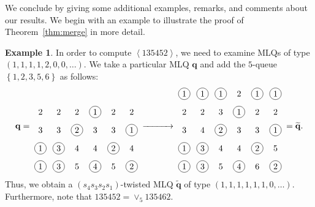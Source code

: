 \documentclass[reqno]{amsart}
\newcommand{\0}{\phantom{c}}
\newcommand{\swt}[1]{\left\langle #1 \right\rangle} %
\newcommand{\merge}[1]{\vee_{#1}} %
\newcommand{\qq}{\mathbf{q}}
\newcommand{\set}[1]{\left\{ #1 \right\}}
\theoremstyle{plain}
\theoremstyle{definition}
\newtheorem{example}[thm]{Example}
\numberwithin{equation}{section}
\begin{document}
We conclude by giving some additional examples, remarks, and comments about our results.
We begin with an example to illustrate the proof of Theorem~\ref{thm:merge} in more detail.

\begin{example}
In order to compute $\swt{135452}$, we need to examine MLQs of type $(1,1,1,1, 2, 0, 0, \ldots)$.
We take a particular MLQ $\qq$ and add the $5$-queue $\set{1,2,3,5,6}$ as follows:
\[
\qq = \;
\begin{tikzpicture}[baseline=66,scale=0.75,every node/.style={inner sep=2pt}]
\node at (0, 4){2};\node at (1, 4){2};\node at (2, 4){2};\node[circle, draw=black] at (3, 4){1};\node at (4, 4){2};\node at (5, 4){2};\node at (0, 3){3};\node at (1, 3){3};\node[circle, draw=black] at (2, 3){2};\node at (3, 3){3};\node at (4, 3){3};\node[circle, draw=black] at (5, 3){1};\node[circle, draw=black] at (0, 2){1};\node[circle, draw=black] at (1, 2){3};\node at (2, 2){4};\node at (3, 2){4};\node[circle, draw=black] at (4, 2){2};\node at (5, 2){4};\node[circle, draw=black] at (0, 1){1};\node[circle, draw=black] at (1, 1){3};\node at (2, 1){5};\node[circle, draw=black] at (3, 1){4};\node at (4, 1){5};\node[circle, draw=black] at (5, 1){2};
\end{tikzpicture}
\; \xrightarrow{\hspace{30pt}} \;
\begin{tikzpicture}[baseline=66,scale=0.75,every node/.style={inner sep=2pt}]
\node[circle, draw=black] at (0, 5){1};\node[circle, draw=black] at (1, 5){1};\node[circle, draw=black] at (2, 5){1};\node at (3, 5){2};\node[circle, draw=black] at (4, 5){1};\node[circle, draw=black] at (5, 5){1};\node at (0, 4){2};\node at (1, 4){2};\node at (2, 4){3};\node[circle, draw=black] at (3, 4){1};\node at (4, 4){2};\node at (5, 4){2};\node at (0, 3){3};\node at (1, 3){4};\node[circle, draw=black] at (2, 3){2};\node at (3, 3){3};\node at (4, 3){3};\node[circle, draw=black] at (5, 3){1};\node[circle, draw=black] at (0, 2){1};\node[circle, draw=black] at (1, 2){3};\node at (2, 2){4};\node at (3, 2){4};\node[circle, draw=black] at (4, 2){2};\node at (5, 2){5};\node[circle, draw=black] at (0, 1){1};\node[circle, draw=black] at (1, 1){3};\node at (2, 1){5};\node[circle, draw=black] at (3, 1){4};\node at (4, 1){6};\node[circle, draw=black] at (5, 1){2};
\end{tikzpicture}
\; = \widetilde{\qq}.
\]
Thus, we obtain a $(s_4 s_3 s_2 s_1)$-twisted MLQ $\widetilde{\qq}$ of type $(1, 1, 1, 1, 1, 1, 0, \ldots)$.
Furthermore, note that $135452 = \merge{5} 135462$.

\end{example}
\end{document}

